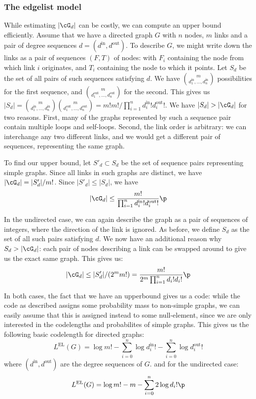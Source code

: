 \subsubsection{The edgelist model}

While estimating $|\cG_d|$ can be costly, we can compute an upper bound efficiently. Assume that we have a directed graph $G$ with $n$ nodes, $m$ links and a pair of degree sequences $d = (d^\text{in}, d^\text{out})$. To describe $G$, we might write down the links as a pair of sequences $(F, T)$ of nodes: with  $F_i$ containing the node from which link $i$ originates, and $T_i$ containing the node to which it points. Let $S_d$ be the set of all pairs of such sequences satisfying $d$. We have $ m \choose d_1^\text{in}, \ldots, d_n^\text{in}$ possibilities for the first sequence, and $m \choose d_1^\text{out}, \ldots, d_n^\text{out}$ for the second. This gives us $|S_d| = {m \choose d_1^\text{in}, \ldots, d_n^\text{in}}{m \choose d_1^\text{out}, \ldots, d_n^\text{out}} = m!m! / \prod_{i=1}^n d^\text{in}_i ! d^\text{out}_i !$. We have $|S_d| > |\cG_d|$ for two reasons. First, many of the graphs represented by such a sequence pair contain multiple loops and self-loops. Second, the link order is arbitrary: we can interchange any two different links, and we would get a different pair of sequences, representing the same graph. 

To find our upper bound, let $S'_d \subset S_d$ be the set of sequence pairs representing simple graphs. Since all links in such graphs are distinct, we have $|\cG_d| = |S'_d|/m!$. Since $|S'_d| \leq |S_d|$, we have \footnotemark
\[
|\cG_d| \leq \frac{m!}{\prod_{i=1}^n d^\text{in}_i ! d^\text{out}_i !} \p
\]


In the undirected case, we can again describe the graph as a pair of sequences of integers, where the direction of the link is ignored. As before, we define $S_d$ as the set of all such pairs satisfying $d$. We now have an additional reason why $S_d > |\cG_d|$: each pair of nodes describing a link can be swapped around to give us the exact same graph. This gives us:
\[
|\cG_d| \leq |S'_d| / (2^m m!) = \frac{m!}{2^m \prod_{i=1}^n d_i! d_i!} \p
\]

In both cases, the fact that we have an upperbound gives us a code: while the code as described assigns some probability mass to non-simple graphs, we can easily assume that this is assigned instead to some null-element, since we are only interested in the codelengths and probabilites of simple graphs. This gives us the following basic codelength for directed graphs:
\[
L^\text{EL}(G) = \log m! - \sum_{i=0}^n \log d_i^\text{in}! - \sum_{i=0}^n \log d_i^\text{out}!   
\]
where $(d^\text{in}, d^\text{out})$ are the degree sequences of $G$. and for the undirected case:
\[
L^\text{EL}(G) = \log m! - m - \sum_{i=0}^n 2 \log d_i! \p   
\]

